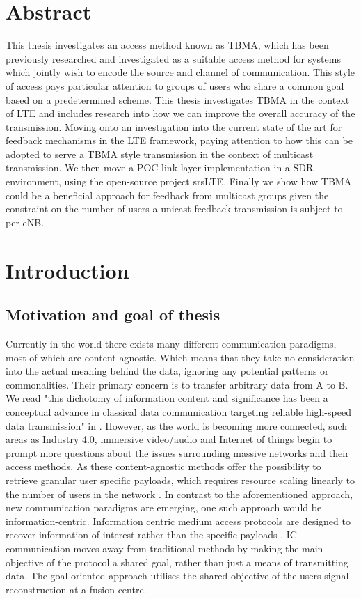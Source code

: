 \documentclass{article}
\begin{document}
\newpage

\section*{Abstract}
This thesis investigates an access method known as \ac{TBMA}, which has been previously researched and investigated as a suitable access method for systems which jointly wish to encode the source and channel of communication. This style of access pays particular attention to groups of users who share a common goal based on a predetermined scheme. This thesis investigates \ac{TBMA} in the context of LTE and includes research into how we can improve the overall accuracy of the transmission. Moving onto an investigation into the current state of the art for feedback mechanisms in the LTE framework, paying attention to how this can be adopted to serve a \ac{TBMA} style transmission in the context of multicast transmission. We then move a \ac{POC} link layer implementation in a \ac{SDR} environment, using the open-source project srsLTE.
Finally we show how TBMA could be a beneficial approach for feedback from multicast groups given the constraint on the number of users a unicast feedback transmission is subject to per \ac{eNB}.  
\newpage

\section{Introduction}\label{intro}
\subsection{Motivation and goal of thesis}

Currently in the world there exists many different communication paradigms, most of which are content-agnostic. Which means that they take no consideration into the actual meaning behind the data, ignoring any potential patterns or commonalities. Their primary concern is to transfer arbitrary data from A to B. We read "this dichotomy of information content and significance has been a conceptual advance in classical data communication targeting reliable high-speed data transmission" in \cite{kountouris}. 
However, as the world is becoming more connected, such areas as Industry 4.0, immersive video/audio and Internet of things begin to prompt more questions about the issues surrounding massive networks and their access methods. As these content-agnostic methods offer the possibility to retrieve granular user specific payloads, which requires resource scaling linearly to the number of users in the network \cite{aloha,graphbased_analysis,coded_ran,capacity_gauss}. In contrast to the aforementioned approach, new communication paradigms are emerging, one such approach would be information-centric. Information centric  medium access protocols are designed to recover information of interest rather than the specific payloads \cite{kountouris,sem_coms,sem_filter,source_chane_coding,source_chane_coding2}. \ac{IC} communication moves away from traditional methods by making the main objective of the protocol a shared goal, rather than just a means of transmitting data. The goal-oriented approach utilises the shared objective of the users signal reconstruction at a fusion centre. 
\end{document}
